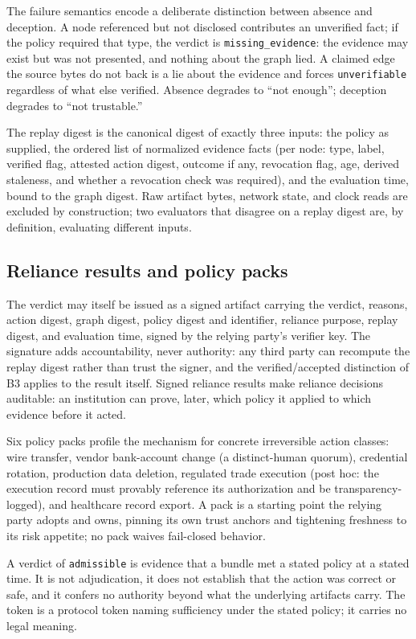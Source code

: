 \documentclass[11pt]{article}
\newcommand{\code}[1]{\texttt{#1}}
\begin{document}
The failure semantics encode a deliberate distinction between absence and
deception. A node referenced but not disclosed contributes an unverified fact; if
the policy required that type, the verdict is \code{missing\_evidence}: the
evidence may exist but was not presented, and nothing about the graph lied. A
claimed edge the source bytes do not back is a lie about the evidence and forces
\code{unverifiable} regardless of what else verified. Absence degrades to ``not
enough''; deception degrades to ``not trustable.''

The replay digest is the canonical digest of exactly three inputs: the policy as
supplied, the ordered list of normalized evidence facts (per node: type, label,
verified flag, attested action digest, outcome if any, revocation flag, age,
derived staleness, and whether a revocation check was required), and the evaluation
time, bound to the graph digest. Raw artifact bytes, network state, and clock reads
are excluded by construction; two evaluators that disagree on a replay digest are,
by definition, evaluating different inputs.

\subsection{Reliance results and policy packs}

The verdict may itself be issued as a signed artifact carrying the verdict,
reasons, action digest, graph digest, policy digest and identifier, reliance
purpose, replay digest, and evaluation time, signed by the relying party's
verifier key. The signature adds accountability, never authority: any third party
can recompute the replay digest rather than trust the signer, and the
verified/accepted distinction of B3 applies to the result itself. Signed reliance
results make reliance decisions auditable: an institution can prove, later, which
policy it applied to which evidence before it acted.

Six policy packs profile the mechanism for concrete irreversible action classes:
wire transfer, vendor bank-account change (a distinct-human quorum), credential
rotation, production data deletion, regulated trade execution (post hoc: the
execution record must provably reference its authorization and be
transparency-logged), and healthcare record export. A pack is a starting point the
relying party adopts and owns, pinning its own trust anchors and tightening
freshness to its risk appetite; no pack waives fail-closed behavior.

A verdict of \code{admissible} is evidence that a bundle met a stated policy at a
stated time. It is not adjudication, it does not establish that the action was
correct or safe, and it confers no authority beyond what the underlying artifacts
carry. The token is a protocol token naming sufficiency under the stated policy; it
carries no legal meaning.
\end{document}
